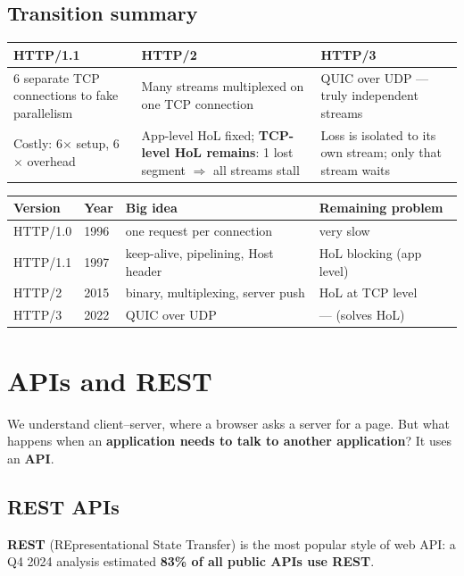 \subsection{Transition summary}
\begin{center}
\begin{tabularx}{\textwidth}{X X X}
\toprule
\textbf{HTTP/1.1} & \textbf{HTTP/2} & \textbf{HTTP/3} \\
\midrule
6 separate TCP connections to fake parallelism & Many streams multiplexed on one TCP connection & QUIC over UDP --- truly independent streams \\
Costly: 6$\times$ setup, 6$\times$ overhead & App-level HoL fixed; \textbf{TCP-level HoL remains}: 1 lost segment $\Rightarrow$ all streams stall & Loss is isolated to its own stream; only that stream waits \\
\bottomrule
\end{tabularx}
\end{center}

\begin{center}
\begin{tabular}{llll}
\toprule
Version & Year & Big idea & Remaining problem \\
\midrule
HTTP/1.0 & 1996 & one request per connection & very slow \\
HTTP/1.1 & 1997 & keep-alive, pipelining, Host header & HoL blocking (app level) \\
HTTP/2 & 2015 & binary, multiplexing, server push & HoL at TCP level \\
HTTP/3 & 2022 & QUIC over UDP & --- (solves HoL) \\
\bottomrule
\end{tabular}
\end{center}

\section{APIs and REST}
We understand client--server, where a browser asks a server for a page. But what happens when an \textbf{application needs to talk to another application}? It uses an \textbf{API}.

\subsection{REST APIs}
\textbf{REST} (REpresentational State Transfer) is the most popular style of web API: a Q4 2024 analysis estimated \textbf{83\% of all public APIs use REST}.

